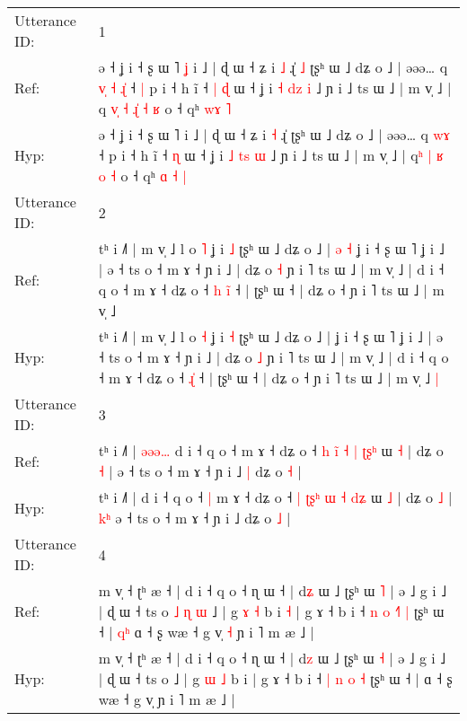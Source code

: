 \documentclass[10pt]{article}
\DeclareRobustCommand{\hl}[1]{{\textcolor{red}{#1}}}
\begin{document}
\begin{longtable}{ll}
\toprule
Utterance ID: & 1 \\
Ref: & ə ˧ ʝ i ˧ ʂ ɯ ˥\hl{ }\hl{ʝ} i ˩ | ɖ ɯ ˧ ʑ i \hl{˩} ɻ̍\hl{ }\hl{˩} ʈʂʰ ɯ ˩ dʑ o ˩ | əəə… q\hl{ }\hl{v}\hl{̩}\hl{ }\hl{˧} \hl{ɻ}\hl{̍} ˧\hl{ }\hl{|} p i ˧ h ĩ ˧\hl{ }\hl{|} \hl{ɖ} ɯ ˧ ʝ i \hl{˧} \hl{d}\hl{z} \hl{i} ˩ ɲ i ˩ ts ɯ ˩ | m v̩ ˩ | q\hl{ }\hl{v}\hl{̩} \hl{˧} \hl{ɻ}\hl{̍} \hl{˧} \hl{ʁ} o ˧ qʰ \hl{}\hl{w}\hl{ɤ} \hl{˥}
 \\
Hyp: & ə ˧ ʝ i ˧ ʂ ɯ ˥\hl{}\hl{} i ˩ | ɖ ɯ ˧ ʑ i \hl{˧} ɻ̍\hl{}\hl{} ʈʂʰ ɯ ˩ dʑ o ˩ | əəə… q\hl{}\hl{}\hl{}\hl{}\hl{} \hl{w}\hl{ɤ} ˧\hl{}\hl{} p i ˧ h ĩ ˧\hl{}\hl{} \hl{ɳ} ɯ ˧ ʝ i \hl{˩} \hl{t}\hl{s} \hl{ɯ} ˩ ɲ i ˩ ts ɯ ˩ | m v̩ ˩ | q\hl{}\hl{}\hl{ʰ} \hl{|} \hl{}\hl{ʁ} \hl{o} \hl{˧} o ˧ qʰ \hl{ɑ}\hl{ }\hl{˧} \hl{|}
 \\
\midrule
Utterance ID: & 2 \\
Ref: & tʰ i ˩˥ | m v̩ ˩ l o \hl{˥} ʝ i \hl{˩} ʈʂʰ ɯ ˩ dʑ o ˩ |\hl{ }\hl{ə}\hl{ }\hl{˧} ʝ i ˧ ʂ ɯ ˥ ʝ i ˩ | ə ˧ ts o ˧ m ɤ ˧ ɲ i ˩ | dʑ o \hl{˧} ɲ i ˥ ts ɯ ˩ | m v̩ ˩ | d i ˧ q o ˧ m ɤ ˧ dʑ o ˧\hl{ }\hl{h} \hl{i}\hl{̃} ˧ | ʈʂʰ ɯ ˧ | dʑ o ˧ ɲ i ˥ ts ɯ ˩ | m v̩ ˩\hl{}\hl{}
 \\
Hyp: & tʰ i ˩˥ | m v̩ ˩ l o \hl{˧} ʝ i \hl{˧} ʈʂʰ ɯ ˩ dʑ o ˩ |\hl{}\hl{}\hl{}\hl{} ʝ i ˧ ʂ ɯ ˥ ʝ i ˩ | ə ˧ ts o ˧ m ɤ ˧ ɲ i ˩ | dʑ o \hl{˩} ɲ i ˥ ts ɯ ˩ | m v̩ ˩ | d i ˧ q o ˧ m ɤ ˧ dʑ o ˧\hl{}\hl{} \hl{ɻ}\hl{̍} ˧ | ʈʂʰ ɯ ˧ | dʑ o ˧ ɲ i ˥ ts ɯ ˩ | m v̩ ˩\hl{ }\hl{|}
 \\
\midrule
Utterance ID: & 3 \\
Ref: & tʰ i ˩˥ |\hl{ }\hl{ə}\hl{ə}\hl{ə}\hl{…} d i ˧ q o ˧\hl{}\hl{} m ɤ ˧ dʑ o ˧ \hl{h} \hl{}\hl{i}\hl{̃} \hl{˧} \hl{|} \hl{ʈ}\hl{ʂ}\hl{ʰ} ɯ \hl{˧} | dʑ o \hl{˧} |\hl{}\hl{}\hl{} ə ˧ ts o ˧ m ɤ ˧ ɲ i ˩\hl{ }\hl{|} dʑ o \hl{˧} |
 \\
Hyp: & tʰ i ˩˥ |\hl{}\hl{}\hl{}\hl{}\hl{} d i ˧ q o ˧\hl{ }\hl{|} m ɤ ˧ dʑ o ˧ \hl{|} \hl{ʈ}\hl{ʂ}\hl{ʰ} \hl{ɯ} \hl{˧} \hl{}\hl{d}\hl{ʑ} ɯ \hl{˩} | dʑ o \hl{˩} |\hl{ }\hl{k}\hl{ʰ} ə ˧ ts o ˧ m ɤ ˧ ɲ i ˩\hl{}\hl{} dʑ o \hl{˩} |
 \\
\midrule
Utterance ID: & 4 \\
Ref: & m v̩ ˧ ʈʰ æ ˧ | d i ˧ q o ˧ ɳ ɯ ˧ | d\hl{ʑ} ɯ ˩ ʈʂʰ ɯ \hl{˥} | ə ˩ g i ˩ | ɖ ɯ ˧ ts o\hl{ }\hl{˩}\hl{ }\hl{ɳ}\hl{ }\hl{ɯ} ˩ | g \hl{ɤ} \hl{˧} b i\hl{ }\hl{˧} | g ɤ ˧ b i ˧ \hl{n} \hl{o} \hl{˧}\hl{˥} \hl{|} ʈʂʰ ɯ ˧ |\hl{ }\hl{q}\hl{ʰ} ɑ ˧ ʂ wæ ˧ g v̩\hl{ }\hl{˧} ɲ i ˥ m æ ˩ |
 \\
Hyp: & m v̩ ˧ ʈʰ æ ˧ | d i ˧ q o ˧ ɳ ɯ ˧ | d\hl{z} ɯ ˩ ʈʂʰ ɯ \hl{˧} | ə ˩ g i ˩ | ɖ ɯ ˧ ts o\hl{}\hl{}\hl{}\hl{}\hl{}\hl{} ˩ | g \hl{ɯ} \hl{˩} b i\hl{}\hl{} | g ɤ ˧ b i ˧ \hl{|} \hl{n} \hl{}\hl{o} \hl{˧} ʈʂʰ ɯ ˧ |\hl{}\hl{}\hl{} ɑ ˧ ʂ wæ ˧ g v̩\hl{}\hl{} ɲ i ˥ m æ ˩ |

\end{longtable}
\end{document}
